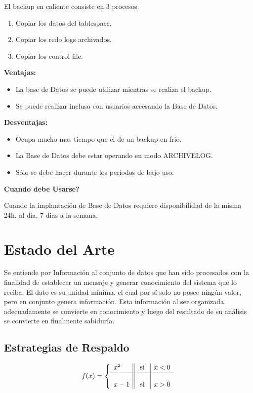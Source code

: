 El backup en caliente consiste en 3 procesos:

\begin{enumerate}
\item Copiar los datos del tablespace.
\item Copiar los redo logs archivados.
\item Copiar los control file.
\end{enumerate}

\textbf{Ventajas:}
\begin{itemize}
\item La base de Datos se puede utilizar mientras se realiza el backup.
\item Se puede realizar incluso con usuarios accesando la Base de Datos.
\end{itemize}

\textbf{Desventajas:}
\begin{itemize}
\item Ocupa mucho mas tiempo que el de un backup en frio.
\item La Base de Datos debe estar operando en modo ARCHIVELOG.
\item Sólo se debe hacer durante los períodos de bajo uso.
\end{itemize}

\textbf{Cuando debe Usarse?}

Cuando la implantación de Base de Datos requiere disponibilidad de la misma 24h. al
día, 7 dias a la semana.

\section{Estado del Arte}
Se entiende por Información al conjunto de datos que han sido procesados con la finalidad de establecer un mensaje y generar conocimiento del sistema que lo reciba. El dato es su unidad mínima, el cual por sí solo no posee ningún valor, pero en conjunto genera información. Esta información al ser organizada adecuadamente se convierte en conocimiento y luego del resultado de su análisis se convierte en finalmente sabiduría. 

\subsection{Estrategias de Respaldo}

\begin{equation}
f(x)= \left\{ \begin{array}{l||c|l}
x^2 & \mbox{ si } & x<0 \\ \hline
& & \\
x-1 & \mbox{ si } & x>0
\end{array}
\right.	
\end{equation}

